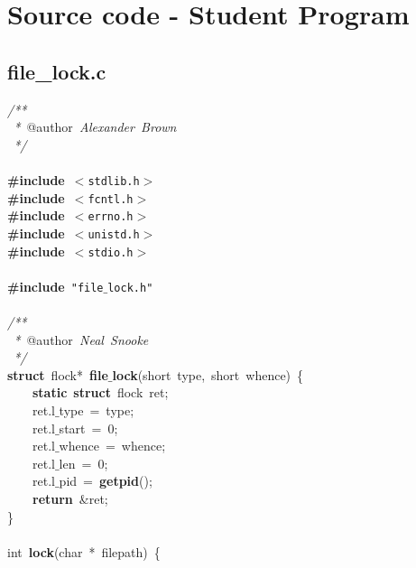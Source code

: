 \section{Source code - Student Program}
\normalsize
\rmfamily
\subsection{file\_lock.c}
\scriptsize
\sffamily
\noindent
\mbox{}\textit{/**} \\
\mbox{}\textit{\ *\ }@author\textit{\ Alexander\ Brown} \\
\mbox{}\textit{\ */} \\
\mbox{} \\
\mbox{}\textbf{\#include}\ \texttt{$<$stdlib.h$>$} \\
\mbox{}\textbf{\#include}\ \texttt{$<$fcntl.h$>$} \\
\mbox{}\textbf{\#include}\ \texttt{$<$errno.h$>$} \\
\mbox{}\textbf{\#include}\ \texttt{$<$unistd.h$>$} \\
\mbox{}\textbf{\#include}\ \texttt{$<$stdio.h$>$} \\
\mbox{} \\
\mbox{}\textbf{\#include}\ \texttt{"{}file$\_$lock.h"{}} \\
\mbox{} \\
\mbox{}\textit{/**} \\
\mbox{}\textit{\ *\ }@author\textit{\ Neal\ Snooke} \\
\mbox{}\textit{\ */} \\
\mbox{}\textbf{struct}\ flock*\ \textbf{file$\_$lock}(short\ type,\ short\ whence)\ \{ \\
\mbox{}\ \ \ \ \textbf{static}\ \textbf{struct}\ flock\ ret; \\
\mbox{}\ \ \ \ ret.l$\_$type\ =\ type; \\
\mbox{}\ \ \ \ ret.l$\_$start\ =\ 0; \\
\mbox{}\ \ \ \ ret.l$\_$whence\ =\ whence; \\
\mbox{}\ \ \ \ ret.l$\_$len\ =\ 0; \\
\mbox{}\ \ \ \ ret.l$\_$pid\ =\ \textbf{getpid}(); \\
\mbox{}\ \ \ \ \textbf{return}\ \&ret; \\
\mbox{}\} \\
\mbox{} \\
\mbox{}int\ \textbf{lock}(char\ *\ filepath)\ \{ \\
